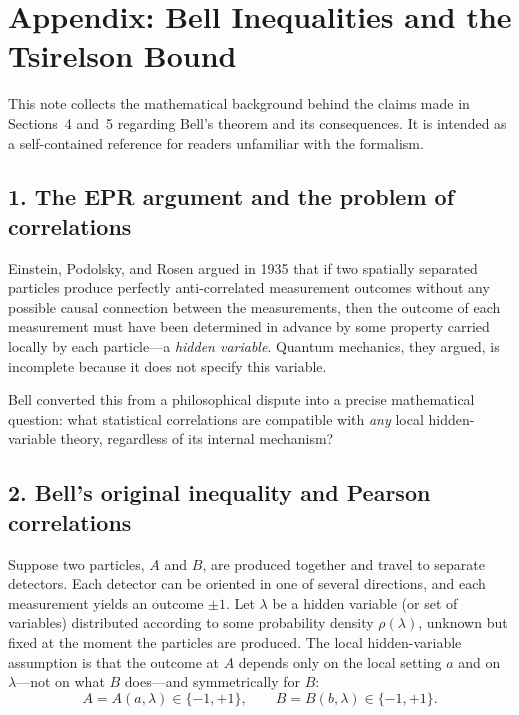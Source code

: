 \section{Appendix: Bell Inequalities and the Tsirelson Bound}
\label{app:bell}

This note collects the mathematical background behind the claims made in Sections~4 and~5 regarding Bell's theorem and its consequences. It is intended as a self-contained reference for readers unfamiliar with the formalism.

\subsection*{1. The EPR argument and the problem of correlations}

Einstein, Podolsky, and Rosen argued in 1935 \cite{einstein_1935_epr} that if two spatially separated particles produce perfectly anti-correlated measurement outcomes without any possible causal connection between the measurements, then the outcome of each measurement must have been determined in advance by some property carried locally by each particle---a \textit{hidden variable}. Quantum mechanics, they argued, is incomplete because it does not specify this variable.

\medskip

Bell \cite{bell_1964_epr} converted this from a philosophical dispute into a precise mathematical question: what statistical correlations are compatible with \textit{any} local hidden-variable theory, regardless of its internal mechanism?

\subsection*{2. Bell's original inequality and Pearson correlations}

Suppose two particles, $A$ and $B$, are produced together and travel to separate detectors. Each detector can be oriented in one of several directions, and each measurement yields an outcome $\pm1$. Let $\lambda$ be a hidden variable (or set of variables) distributed according to some probability density $\rho(\lambda)$, unknown but fixed at the moment the particles are produced. The local hidden-variable assumption is that the outcome at $A$ depends only on the local setting $a$ and on $\lambda$---not on what $B$ does---and symmetrically for $B$:
\begin{equation}
  A = A(a,\lambda) \in \{-1,+1\}, \qquad
  B = B(b,\lambda) \in \{-1,+1\}.
  \label{eq:lhv}
\end{equation}

